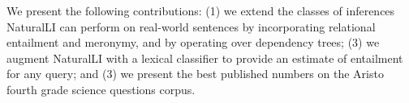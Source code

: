 

We present the following contributions:
(1) we extend the classes of inferences NaturalLI can perform on real-world sentences by
  incorporating relational entailment and meronymy, and by operating over dependency trees;
(3) we augment NaturalLI with a lexical classifier to provide an estimate of entailment
  for any query;
and 
(3) we present the best
    published numbers on the Aristo fourth grade science questions corpus.


